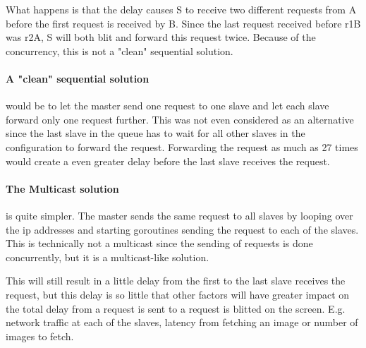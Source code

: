 \documentclass[12pt, a4paper, oneside]{article}
\begin{document}
What happens is that the delay causes S to receive two different requests from A before the first request is received by B. Since the last request received before r1B was r2A, S will both blit and forward this request twice. Because of the concurrency, this is not a "clean" sequential solution. 

\paragraph{A "clean" sequential solution}
would be to let the master send one request to one slave and let each slave forward only one request further. This was not even considered as an alternative since the last slave in the queue has to wait for all other slaves in the configuration to forward the request. Forwarding the request as much as 27 times would create a even greater delay before the last slave receives the request.

\paragraph{The Multicast solution}
is quite simpler. The master sends the same request to all slaves by looping over the ip addresses and starting goroutines sending the request to each of the slaves. This is technically not a multicast since the sending of requests is done concurrently, but it is a multicast-like solution.

This will still result in a little delay from the first to the last slave receives the request, but this delay is so little that other factors will have greater impact on the total delay from a request is sent to a request is blitted on the screen. E.g. network traffic at each of the slaves, latency from fetching an image or number of images to fetch.
\end{document}
